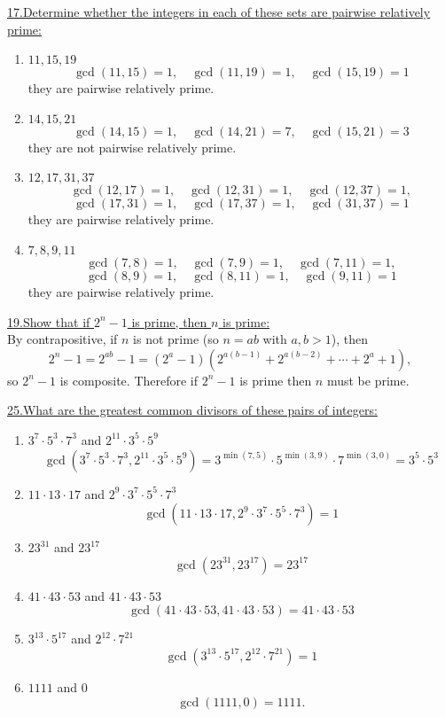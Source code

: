 \documentclass[12pt]{article}
\begin{document}
\newpage
\noindent\underline{17.\;Determine whether the integers in each of these sets are pairwise relatively prime:}
\begin{enumerate}[label=(\alph*)]
    \item $11, 15 ,19$
    \[
    \gcd(11, 15) = 1, \quad \gcd(11, 19) = 1, \quad \gcd(15, 19) = 1
    \]
    they are pairwise relatively prime.
    \item $14, 15 ,21$
    \[
    \gcd(14, 15) = 1, \quad \gcd(14, 21) = 7, \quad \gcd(15, 21) = 3
    \]
    they are not pairwise relatively prime.
    \item $12, 17, 31 ,37$
    \[
    \gcd(12, 17) = 1, \quad \gcd(12, 31) = 1, \quad \gcd(12, 37) = 1, \] 
    \[\gcd(17, 31) = 1, \quad \gcd(17, 37) = 1, \quad \gcd(31, 37) = 1
    \]
    they are pairwise relatively prime.
    \item $7, 8, 9, 11$
    \[
    \gcd(7, 8) = 1, \quad \gcd(7, 9) = 1, \quad \gcd(7, 11) = 1, \] 
    \[\gcd(8, 9) = 1, \quad \gcd(8, 11) = 1, \quad \gcd(9, 11) = 1
    \]
    they are pairwise relatively prime.
\end{enumerate}

\vspace{5mm}
\noindent\underline{19.\;Show that if $2^n-1$ is prime, then $n$ is prime:}
\\\indent By contrapositive, if $n$ is not prime (so $n = ab$ with $a,b>1$), then
\[
2^n -1 = 2^{ab} -1 = (2^a-1)\left(2^{a(b-1)} + 2^{a(b-2)} + \cdots + 2^a + 1\right),
\]
so \(2^n-1\) is composite. Therefore if \(2^n-1\) is prime then \(n\) must be prime.

\vspace{5mm}
\noindent\underline{25.\;What are the greatest common divisors of these pairs of integers:}
\begin{enumerate}[label=(\alph*)]
    \item $3^7 \cdot 5^3 \cdot 7^3$ and $2^{11} \cdot 3^5 \cdot 5^9$
\[
\gcd(3^7 \cdot 5^3 \cdot 7^3, 2^{11} \cdot 3^5 \cdot 5^9) = 3^{\min(7,5)} \cdot 5^{\min(3,9)} \cdot 7^{\min(3,0)} = 3^5 \cdot 5^3
\]
    \item $11 \cdot 13 \cdot 17$ and $2^9 \cdot 3^7 \cdot 5^5 \cdot 7^3$
\[
\gcd(11 \cdot 13 \cdot 17, 2^9 \cdot 3^7 \cdot 5^5 \cdot 7^3) = 1
\]
    \item $23^{31}$ and $23^{17}$
\[
\gcd(23^{31}, 23^{17}) = 23^{17}
\]
    \item $41 \cdot 43 \cdot 53$ and $41 \cdot 43 \cdot 53$
\[
\gcd(41 \cdot 43 \cdot 53, 41 \cdot 43 \cdot 53) = 41 \cdot 43 \cdot 53
\]
    \item $3^{13} \cdot 5^{17}$ and $2^{12} \cdot 7^{21}$
\[
\gcd(3^{13} \cdot 5^{17}, 2^{12} \cdot 7^{21}) = 1
\]
    \item $1111$ and $0$
\[
\gcd(1111, 0) = 1111.
\]
\end{enumerate}
\end{document}
